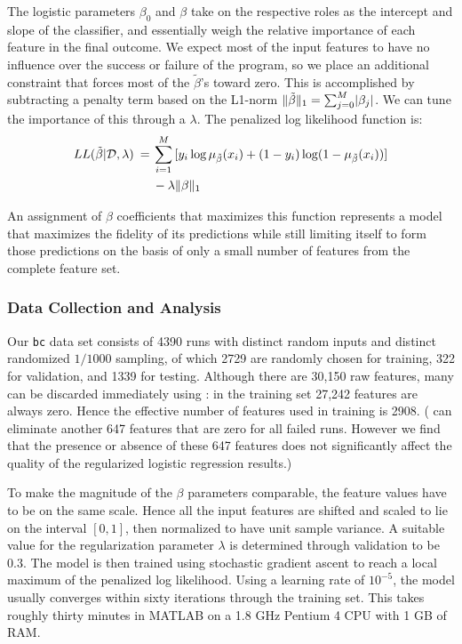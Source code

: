 The logistic parameters $\beta_0$ and $\beta$ take on the respective roles as
the intercept and slope of the classifier, and essentially weigh the
relative importance of each feature in the final outcome.  We expect
most of the input features to have no influence over the success or
failure of the program, so we place an additional constraint that
forces most of the $\tilde{\beta}$'s toward zero.  This is accomplished by
subtracting a penalty term based on the L1-norm $\lVert\tilde{\beta}\rVert_1 =
\sum_{j=0}^M \lvert\beta_j\rvert$.  We can tune the importance of this
 through a  $\lambda$.  The penalized log likelihood function is:
\begin{equation*}
  \begin{split}
    LL (\tilde{\beta} | \mathcal{D}, \lambda ) \:=\:
    & \sum_{i=1}^M \, [y_i \log \mu_{\tilde{\beta}} (x_i) + (1 - y_i) \log (1 - \mu_{\tilde{\beta}} (x_i))] \\
    & - \lambda \lVert\beta\rVert_1
  \end{split}
\end{equation*}

An assignment of $\beta$ coefficients that maximizes this function
represents a model that maximizes the fidelity of its predictions
while still limiting itself to form those predictions on the basis of
only a small number of features from the complete feature set.

\subsubsection{Data Collection and Analysis}

Our \texttt{bc} data set consists of 4390 runs with distinct random
inputs and distinct randomized $1/1000$ sampling, of which 2729 are
randomly chosen for training, 322 for validation, and 1339 for
testing.  Although there are 30,150 raw features, many can be
discarded immediately using :
in the training set 27,242 features are always zero.  Hence the
effective number of features used in training is 2908.
( can eliminate another
647 features that are zero for all failed runs.  However we find that
the presence or absence of these 647 features does not significantly
affect the quality of the regularized logistic regression results.)

To make the magnitude of the $\beta$ parameters comparable, the feature
values have to be on the same scale.  Hence all the input features are
shifted and scaled to lie on the interval $[0, 1]$, then normalized to
have unit sample variance.  A suitable value for the regularization
parameter $\lambda$ is determined through validation to be $0.3$.  The model
is then trained using stochastic gradient ascent to reach a local
maximum of the penalized log likelihood.  Using a learning rate of
$10^{-5}$, the model usually converges within sixty iterations through
the training set.  This takes roughly thirty minutes in MATLAB on a
1.8 GHz Pentium 4 CPU with 1 GB of RAM.

